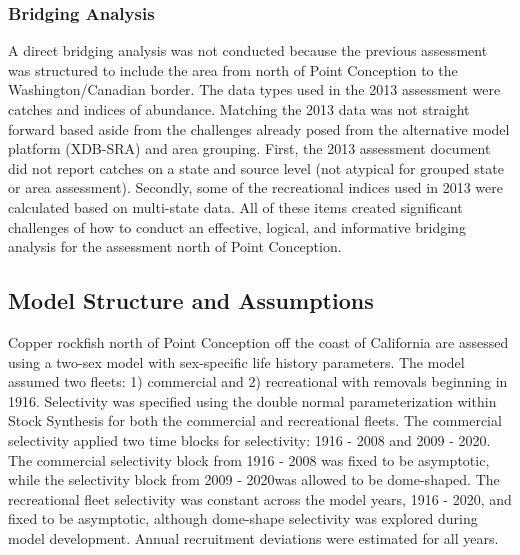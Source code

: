 \documentclass[11pt,
  english,
  a4paper,
]{article}
\begin{document}
\leavevmode\tagmcend\tagstructend\par


\hypertarget{bridging-analysis}{%
\subsubsection{Bridging Analysis}\label{bridging-analysis}}

\leavevmode\tagmcend\tagstructend


A direct bridging analysis was not conducted because the previous assessment was structured to include the area from north of Point Conception to the Washington/Canadian border. The data types used in the 2013 assessment were catches and indices of abundance. Matching the 2013 data was not straight forward based aside from the challenges already posed from the alternative model platform (XDB-SRA) and area grouping. First, the 2013 assessment document did not report catches on a state and source level (not atypical for grouped state or area assessment). Secondly, some of the recreational indices used in 2013 were calculated based on multi-state data. All of these items created significant challenges of how to conduct an effective, logical, and informative bridging analysis for the assessment north of Point Conception.

\leavevmode\tagmcend\tagstructend\par


\hypertarget{model-structure-and-assumptions}{%
\subsection{Model Structure and Assumptions}\label{model-structure-and-assumptions}}

\leavevmode\tagmcend\tagstructend


Copper rockfish north of Point Conception off the coast of California are assessed using a two-sex model with sex-specific life history parameters. The model assumed two fleets: 1) commercial and 2) recreational with removals beginning in 1916. Selectivity was specified using the double normal parameterization within Stock Synthesis for both the commercial and recreational fleets. The commercial selectivity applied two time blocks for selectivity: 1916 - 2008 and 2009 - 2020. The commercial selectivity block from 1916 - 2008 was fixed to be asymptotic, while the selectivity block from 2009 - 2020was allowed to be dome-shaped. The recreational fleet selectivity was constant across the model years, 1916 - 2020, and fixed to be asymptotic, although dome-shape selectivity was explored during model development. Annual recruitment deviations were estimated for all years.
\end{document}
